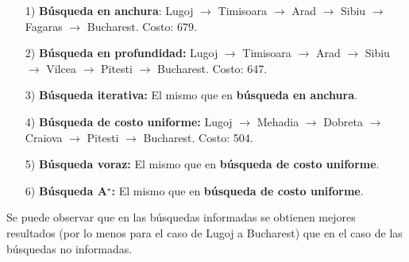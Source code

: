 \documentclass{article}
\begin{document}
\begin{itemize}
\item[1)] \textbf{Búsqueda en anchura}: Lugoj $\rightarrow$ Timisoara $\rightarrow$ Arad $\rightarrow$ Sibiu $\rightarrow$ Fagaras $\rightarrow$ Bucharest. Costo: 679.

\item[2)] \textbf{Búsqueda en profundidad:} Lugoj $\rightarrow$ Timisoara $\rightarrow$ Arad $\rightarrow$ Sibiu $\rightarrow$ Vilcea $\rightarrow$ Pitesti $\rightarrow$ Bucharest. Costo: 647.

\item[3)] \textbf{Búsqueda iterativa:} El mismo que en \textbf{búsqueda en anchura}.

\item[4)] \textbf{Búsqueda de costo uniforme:} Lugoj $\rightarrow$ Mehadia $\rightarrow$ Dobreta $\rightarrow$ Craiova $\rightarrow$ Pitesti $\rightarrow$ Bucharest. Costo: 504.

\item[5)] \textbf{Búsqueda voraz:} El mismo que en \textbf{búsqueda de costo uniforme}.

\item[6)] \textbf{Búsqueda A$^{\star}$:} El mismo que en \textbf{búsqueda de costo uniforme}.

\end{itemize}

Se puede observar que en las búsquedas informadas se obtienen mejores resultados (por lo menos para el caso de Lugoj a Bucharest) que en el caso de las búsquedas no informadas.
\end{document}
